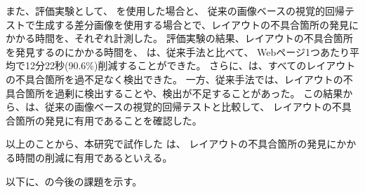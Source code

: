 \par
また、評価実験として、
\toolName を使用した場合と、
従来の画像ベースの視覚的回帰テストで生成する差分画像を使用する場合とで、レイアウトの不具合箇所の発見にかかる時間を、それぞれ計測した。
評価実験の結果、レイアウトの不具合箇所を発見するのにかかる時間を、
\toolName は、従来手法と比べて、
Webページ1つあたり平均で12分22秒(90.6\%)削減することができた。
さらに、\toolName は、すべてのレイアウトの不具合箇所を過不足なく検出できた。
一方、従来手法では、レイアウトの不具合箇所を過剰に検出することや、検出が不足することがあった。
この結果から、\toolName は、従来の画像ベースの視覚的回帰テストと比較して、
レイアウトの不具合箇所の発見に有用であることを確認した。
\par
以上のことから、本研究で試作した \toolName は、
レイアウトの不具合箇所の発見にかかる時間の削減に有用であるといえる。
\par
以下に、\toolName の今後の課題を示す。
